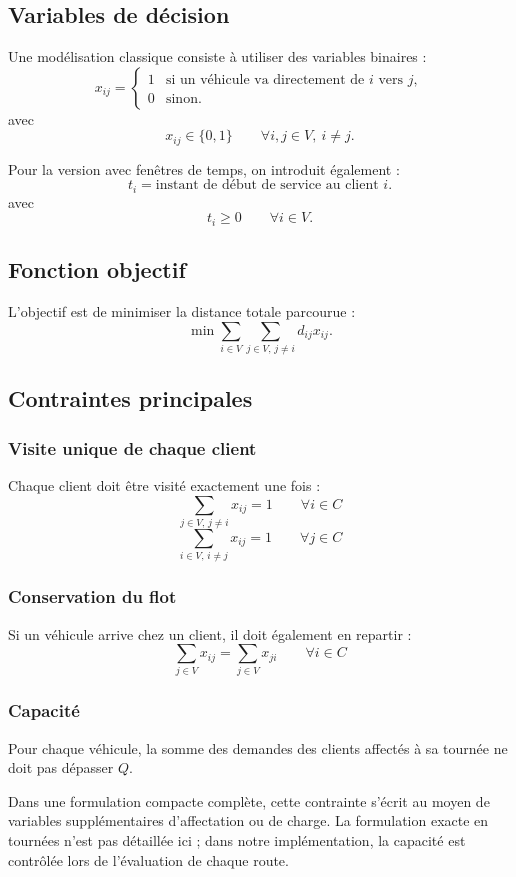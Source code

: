 \documentclass[11pt,a4paper]{article}
\begin{document}
\subsection{Variables de décision}
Une modélisation classique consiste à utiliser des variables binaires :
\[
x_{ij} =
\begin{cases}
1 & \text{si un véhicule va directement de } i \text{ vers } j, \\
0 & \text{sinon.}
\end{cases}
\]
avec
\[
x_{ij} \in \{0,1\} \qquad \forall i,j \in V,\ i \neq j.
\]

Pour la version avec fenêtres de temps, on introduit également :
\[
t_i = \text{instant de début de service au client } i.
\]
avec
\[
t_i \ge 0 \qquad \forall i \in V.
\]

\subsection{Fonction objectif}
L'objectif est de minimiser la distance totale parcourue :
\[
\min \sum_{i \in V} \sum_{j \in V,\, j \neq i} d_{ij} x_{ij}.
\]

\subsection{Contraintes principales}

\subsubsection{Visite unique de chaque client}
Chaque client doit être visité exactement une fois :
\[
\sum_{j \in V,\, j \neq i} x_{ij} = 1 \qquad \forall i \in C
\]
\[
\sum_{i \in V,\, i \neq j} x_{ij} = 1 \qquad \forall j \in C
\]

\subsubsection{Conservation du flot}
Si un véhicule arrive chez un client, il doit également en repartir :
\[
\sum_{j \in V} x_{ij} = \sum_{j \in V} x_{ji} \qquad \forall i \in C
\]

\subsubsection{Capacité}
Pour chaque véhicule, la somme des demandes des clients affectés à sa tournée ne doit pas dépasser \(Q\).

Dans une formulation compacte complète, cette contrainte s'écrit au moyen de variables supplémentaires d'affectation ou de charge. La formulation exacte en tournées n'est pas détaillée ici ; dans notre implémentation, la capacité est contrôlée lors de l'évaluation de chaque route.
\end{document}
